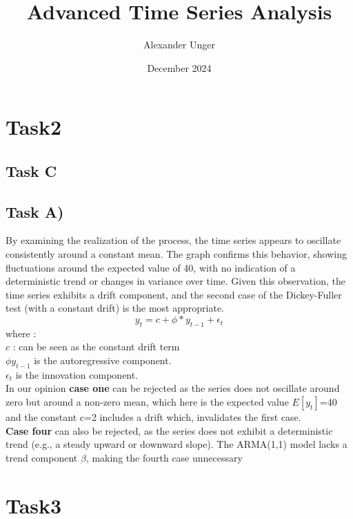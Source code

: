 \documentclass{article}
\title{Advanced Time Series Analysis}
\author{Alexander Unger}
\date{December 2024}
\begin{document}
\maketitle

\section{Task2}

\subsection{Task C}
\subsection{Task A)}
By examining the realization of the process, the time series appears to oscillate consistently around a constant mean. The graph confirms this behavior, showing fluctuations around the expected value of 40, with no indication of a deterministic trend or changes in variance over time.
Given this observation, the time series exhibits a drift component, and the second case of the Dickey-Fuller test (with a constant drift) is the most appropriate.
$$y_t = c + \phi * y_{t-1} + \epsilon_t$$
where :\\
$c$ : can be seen as the constant drift term\\
$\phi y_{t-1}$ is the autoregressive component.\\
$\epsilon_t$ is the innovation component.\\

In our opinion \textbf{case one} can be rejected as the series does not oscillate around zero but around a non-zero mean, which here is the expected value $E[y_t]$=40
and the constant c=2 includes a drift which, invalidates the first case. \\
\textbf{Case four} can also be rejected, as the series does not exhibit a deterministic trend (e.g., a steady upward or downward slope).
The ARMA(1,1) model lacks a trend component $\beta$, making the fourth case unnecessary

\section{Task3}
\end{document}
